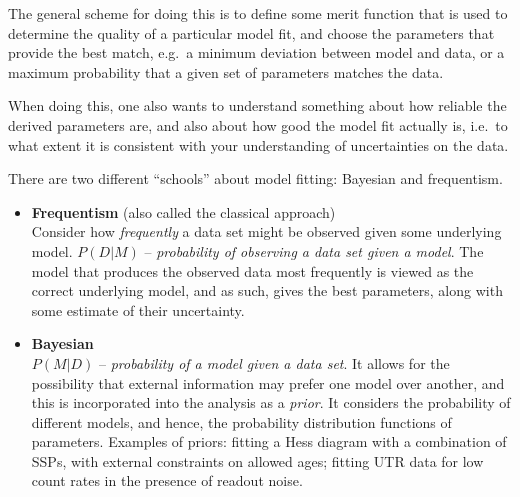 \documentclass[12pt]{article}
\begin{document}
The general scheme for doing this is to define some merit function that is
used to determine the quality of a particular model fit, and choose the
parameters that provide the best match, e.g.\ a minimum deviation between
model and data, or a maximum probability that a given set of parameters
matches the data.

When doing this, one also wants to understand something about how reliable
the derived parameters are, and also about how good the model fit actually is,
i.e.\ to what extent it is consistent with your understanding of
uncertainties on the data.

There are two different ``schools'' about model fitting: Bayesian and
frequentism.

\begin{itemize}
    \item \textbf{Frequentism} (also called the classical approach) \\
        Consider how \emph{frequently} a data set might be observed given
        some underlying model. \textbf{$P(D|M)$} -- \emph{probability of
        observing a data set given a model}. The model that
        produces the observed data most frequently is viewed as the correct
        underlying model, and as such, gives the best parameters, along
        with some estimate of their uncertainty.
    \item \textbf{Bayesian} \\
        \textbf{$P(M|D)$} -- \emph{probability of a model given a data set}.
        It allows for the possibility that external information may prefer
        one model over another, and this is incorporated into the analysis
        as a \emph{prior}. It considers the probability of different models,
        and hence, the probability distribution functions of parameters.
        Examples of priors: fitting a Hess diagram with a combination of
        SSPs, with external constraints on allowed ages; fitting UTR data
        for low count rates in the presence of readout noise.
\end{itemize}
\end{document}
